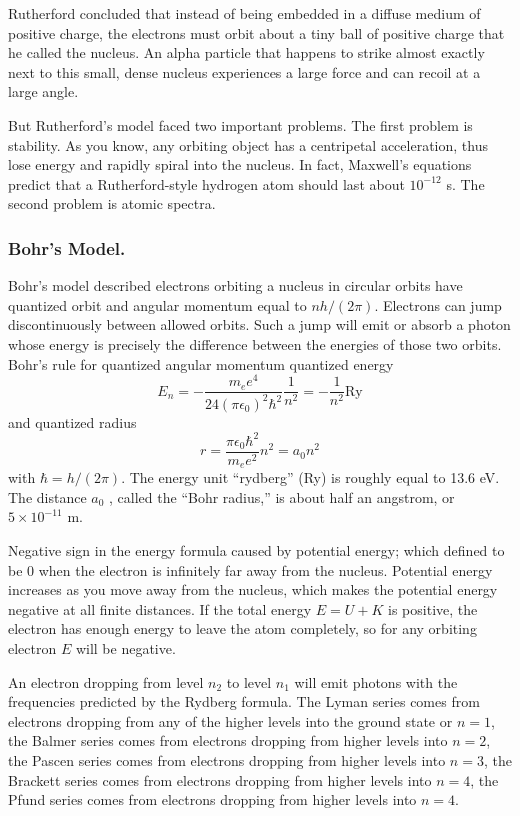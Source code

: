 \documentclass[../../main.tex]{subfiles}
\begin{document}
Rutherford concluded that instead of being embedded in a diffuse medium of positive charge, the electrons must orbit about a tiny ball of positive charge that he called the nucleus. An alpha particle that happens to strike almost exactly next to this small, dense nucleus experiences a large force and can recoil at a large angle.

But Rutherford's model faced two important problems. The first problem is stability. As you know, any orbiting object has a centripetal acceleration, thus lose energy and rapidly spiral into the nucleus. In fact, Maxwell's equations predict that a Rutherford-style hydrogen atom should last about $10^{-12} $ s. The second problem is atomic spectra. 

\subsubsection{Bohr's Model.} Bohr's model described electrons orbiting a nucleus in circular orbits have quantized orbit and angular momentum equal to $nh/(2\pi)$. Electrons can jump discontinuously between allowed orbits. Such a jump will emit or absorb a photon whose energy is precisely the difference between the energies of those two orbits. Bohr's rule for quantized angular momentum quantized energy
\begin{equation*}
        E_n=-\frac{m_ee^4}{24(\pi\epsilon_0)^2\hbar^2}\frac{1}{n^2}=-\frac{1}{n^2}\text{Ry}
\end{equation*}
and quantized radius
\begin{equation*}
    r=\frac{\pi\epsilon_0\hbar^2}{m_ee^2}n^2=a_0n^2
\end{equation*}
with $\hbar=h/(2\pi)$. The energy unit “rydberg” (Ry) is roughly equal to 13.6 eV. The distance $a_0$ , called the “Bohr radius,” is about half an angstrom, or $5 \times 10^{-11}$ m. 

Negative sign in the energy formula caused by potential energy; which defined to be 0 when the electron is infinitely far away from the nucleus. Potential energy increases as you move away from the nucleus, which makes the potential energy negative at all finite distances. If the total energy $E = U + K$ is positive, the electron has enough energy to leave the atom completely, so for any orbiting electron $E$ will be negative. 

An electron dropping from level $n_2$ to level $n_1$ will emit photons with the frequencies predicted by the Rydberg formula. The Lyman series comes from electrons dropping from any of the higher levels into the ground state or $n=1$, the Balmer series comes from electrons dropping from higher levels into $n = 2$, the Pascen series comes from electrons dropping from higher levels into $n = 3$, the Brackett series comes from electrons dropping from higher levels into $n = 4$, the Pfund series comes from electrons dropping from higher levels into $n = 4$.
\end{document}
